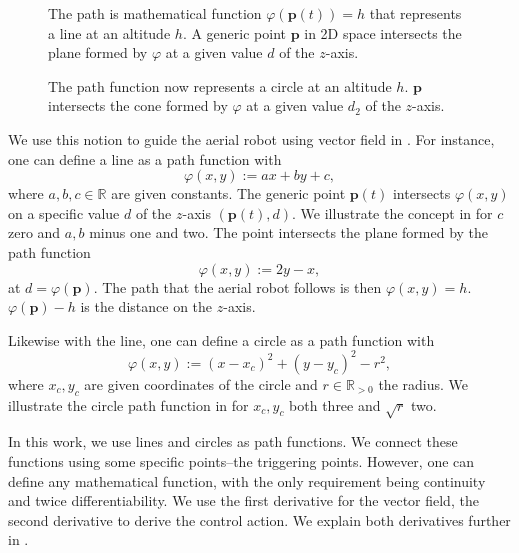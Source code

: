 \begin{figure}[t!]
  \centering
  
  \caption[Concept of a line as a path function]{The path is mathematical function $\varphi(\mathbf{p}(t))=h$ that represents a line at an altitude $h$. A generic point $\mathbf{p}$ in 2D space intersects the plane formed by $\varphi$ at a given value $d$ of the $z$-axis.}
  \label{fig:plot1}
\end{figure}

\begin{figure}[t!]
  \centering
  
  \caption[Concept of a circle as a path function]{The path function now represents a circle at an altitude $h$. $\mathbf{p}$ intersects the cone formed by $\varphi$ at a given value $d_2$ of the $z$-axis.}
  \label{fig:plot11}
\end{figure}

We use this notion to guide the aerial robot using vector field in . For instance, one can define a line as a path function with
\begin{equation}\label{eq:basic-path}
  \varphi(x,y):=ax+by+c,
\end{equation}
where $a,b,c\in\mathbb{R}$ are given constants. The generic point $\mathbf{p}(t)$ intersects $\varphi(x,y)$ on a specific value $d$ of the $z$-axis $(\mathbf{p}(t),d)$. We illustrate the concept in  for $c$ zero and $a,b$ minus one and two. The point intersects the plane formed by the path function
\begin{equation}
  \varphi(x,y):=2y-x,
\end{equation}
at $d=\varphi(\mathbf{p})$. The path that the aerial robot follows is then $\varphi(x,y)=h$. $\varphi(\mathbf{p})-h$ is the distance on the $z$-axis.

Likewise with the line, one can define a circle as a path function with
\begin{equation}
  \varphi(x,y):=(x-x_c)^2+(y-y_c)^2-r^2,
\end{equation}
where $x_c,y_c$ are given coordinates of the circle and $r\in\mathbb{R}_{>0}$ the radius. We illustrate the circle path function in  for $x_c,y_c$ both three and $\sqrt{r}$ two. 

In this work, we use lines and circles as path functions. We connect these functions using some specific points--the triggering points. However, one can define any mathematical function, with the only requirement being continuity and twice differentiability. We use the first derivative for the vector field, the second derivative to derive the control action. We explain both derivatives further in .


